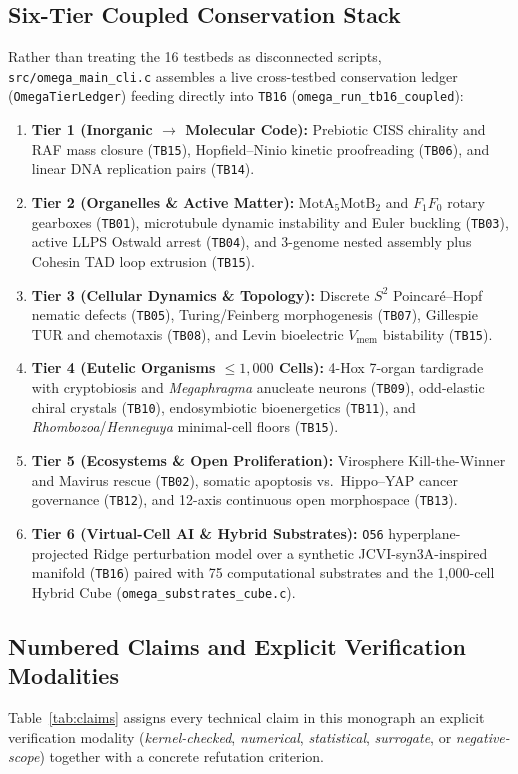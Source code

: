 \documentclass[11pt,reqno]{amsart}
\begin{document}
\subsection{Six-Tier Coupled Conservation Stack}
Rather than treating the 16 testbeds as disconnected scripts, \nolinkurl{src/omega_main_cli.c} assembles a live cross-testbed conservation ledger (\texttt{OmegaTierLedger}) feeding directly into \texttt{TB16} (\nolinkurl{omega_run_tb16_coupled}):
\begin{enumerate}
  \item \textbf{Tier 1 (Inorganic $\to$ Molecular Code):} Prebiotic CISS chirality and RAF mass closure (\texttt{TB15}), Hopfield--Ninio kinetic proofreading (\texttt{TB06}), and linear DNA replication pairs (\texttt{TB14}).
  \item \textbf{Tier 2 (Organelles \& Active Matter):} $\mathrm{MotA}_5\mathrm{MotB}_2$ and $F_1F_0$ rotary gearboxes (\texttt{TB01}), microtubule dynamic instability and Euler buckling (\texttt{TB03}), active LLPS Ostwald arrest (\texttt{TB04}), and 3-genome nested assembly plus Cohesin TAD loop extrusion (\texttt{TB15}).
  \item \textbf{Tier 3 (Cellular Dynamics \& Topology):} Discrete $S^2$ Poincar\'e--Hopf nematic defects (\texttt{TB05}), Turing/Feinberg morphogenesis (\texttt{TB07}), Gillespie TUR and chemotaxis (\texttt{TB08}), and Levin bioelectric $V_{\mathrm{mem}}$ bistability (\texttt{TB15}).
  \item \textbf{Tier 4 (Eutelic Organisms $\le 1{,}000$ Cells):} 4-Hox 7-organ tardigrade with cryptobiosis and \textit{Megaphragma} anucleate neurons (\texttt{TB09}), odd-elastic chiral crystals (\texttt{TB10}), endosymbiotic bioenergetics (\texttt{TB11}), and \textit{Rhombozoa}/\textit{Henneguya} minimal-cell floors (\texttt{TB15}).
  \item \textbf{Tier 5 (Ecosystems \& Open Proliferation):} Virosphere Kill-the-Winner and Mavirus rescue (\texttt{TB02}), somatic apoptosis vs.\ Hippo--YAP cancer governance (\texttt{TB12}), and 12-axis continuous open morphospace (\texttt{TB13}).
  \item \textbf{Tier 6 (Virtual-Cell AI \& Hybrid Substrates):} \texttt{O56} hyperplane-projected Ridge perturbation model over a synthetic JCVI-syn3A-inspired manifold (\texttt{TB16}) paired with 75 computational substrates and the 1,000-cell Hybrid Cube (\nolinkurl{omega_substrates_cube.c}).
\end{enumerate}

\subsection{Numbered Claims and Explicit Verification Modalities}
Table~\ref{tab:claims} assigns every technical claim in this monograph an explicit verification modality (\emph{kernel-checked}, \emph{numerical}, \emph{statistical}, \emph{surrogate}, or \emph{negative-scope}) together with a concrete refutation criterion.
\end{document}
